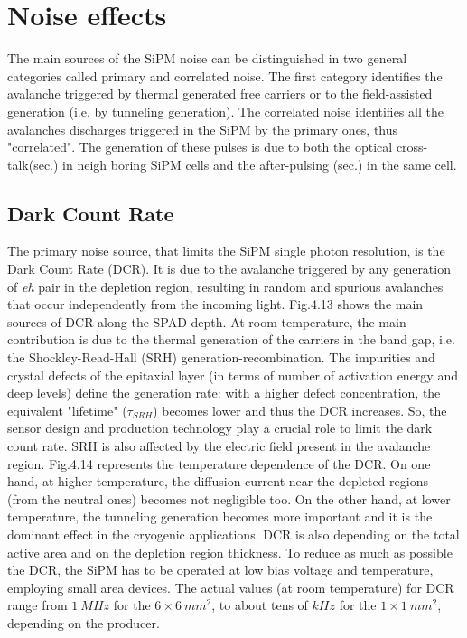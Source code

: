 \section{Noise effects}
The main sources of the SiPM noise can be distinguished in two general categories called primary and correlated noise. The first category identifies the avalanche triggered by thermal generated free carriers or to the field-assisted generation (i.e. by tunneling generation). The correlated noise identifies all the avalanches discharges triggered in the SiPM by the primary ones, thus "correlated". The generation of these pulses is due to both the optical cross-talk(sec.) in neigh boring SiPM cells and the after-pulsing (sec.) in the same cell.

\subsection{Dark Count Rate}
The primary noise source, that limits the SiPM single photon resolution, is the Dark Count Rate (DCR).
It is due to the avalanche triggered by any generation of \textit{eh} pair in the depletion region, resulting in random and spurious avalanches that occur independently from the incoming light.
Fig.4.13 shows the main sources of DCR along the SPAD depth.
At room temperature, the main contribution is due to the thermal generation of the carriers in the band gap, i.e. the Shockley-Read-Hall (SRH) generation-recombination.
The impurities and crystal defects of the epitaxial layer (in terms of number of activation energy and deep levels) define the generation rate: with a higher defect concentration, the equivalent "lifetime" ($\tau_{SRH}$) becomes lower and thus the DCR increases.
So, the sensor design and production technology play a crucial role to limit the dark count rate.
SRH is also affected by the electric field present in the avalanche region.
Fig.4.14 represents the temperature dependence of the DCR.
On one hand, at higher temperature, the diffusion current near the depleted regions (from the neutral ones) becomes not negligible too.
On the other hand, at lower temperature, the tunneling generation becomes more important and it is the dominant effect in the cryogenic applications.
DCR is also depending on the total active area and on the depletion region thickness.
To reduce as much as possible the DCR, the SiPM has to be operated at low bias voltage and temperature, employing small area devices.
The actual values (at room temperature) for DCR range from $1\ MHz$ for the $6\times6\ mm^2$, to about tens of $kHz$ for the $1\times1\ mm^2$, depending on the producer.\\


